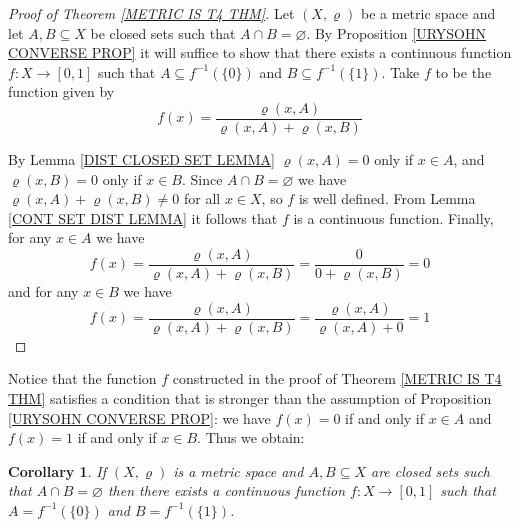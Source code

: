 \documentclass[11pt, letterpaper, oneside]{report}
\theoremstyle{pplain}
\newtheorem{corollary}[theorem]{Corollary}
\newtheorem{ITERMVALUE THM}[theorem]{Intermediate Value Theorem}
\newtheorem{HEINEBOREL THM}[theorem]{Heine-Borel Theorem}
\newtheorem{UMETR THM}[theorem]{Urysohn Metrization Theorem}
\newtheorem{UMETR2 THM}[theorem]{Urysohn Metrization Theorem (v.2)}
\theoremstyle{ddefinition}
\theoremstyle{nnn}
\newtheorem{TDA NN}[theorem]{Topological Data Analysis. }
\theoremstyle{eexercise}
\begin{document}
 \begin{proof}[Proof of Theorem \ref{METRIC IS T4 THM}]
 Let $(X, \varrho)$ be a metric space and let $A, B\subseteq X$ be closed sets such that 
 $A\cap B = \varnothing$. By Proposition \ref{URYSOHN CONVERSE PROP} it will 
 suffice to show that there exists a continuous function 
 $f\colon X \to [0, 1]$
 such that $A\subseteq f^{-1}(\{0\})$ and  $B\subseteq f^{-1}(\{1\})$.
Take $f$ to be the function given by
 $$f(x) = \frac{\varrho(x, A)}{\varrho(x, A)+\varrho(x, B)}$$
 
By Lemma \ref{DIST CLOSED SET LEMMA} $\varrho(x, A) = 0$ only if
 $x\in A$, and $\varrho(x, B) = 0$ only if $x\in B$. Since $A\cap B = \varnothing$ we 
 have $\varrho(x, A) + \varrho(x, B) \neq 0$ for all $x\in X$, so $f$ is well defined. 
From Lemma \ref{CONT SET DIST LEMMA} it follows that $f$ is a continuous 
function. Finally, for any $x\in A$ we have 
$$f(x) = \frac{\varrho(x, A)}{\varrho(x, A)+\varrho(x, B)} = \frac{0}{0+\varrho(x, B)}=0$$
and for any $x\in B$ we have 
$$f(x) = \frac{\varrho(x, A)}{\varrho(x, A)+\varrho(x, B)} = \frac{\varrho(x, A)}{\varrho(x, A)+ 0} =1$$
\end{proof}


Notice that the function $f$ constructed in the proof of Theorem \ref{METRIC IS T4 THM} satisfies 
a condition that is stronger than the assumption of Proposition \ref{URYSOHN CONVERSE PROP}:
we have $f(x) = 0$ if and only if $x\in A$ and $f(x)=1$ if and only if $x\in B$. Thus we obtain: 

\begin{corollary}
\label{METRIC PERFECTLY NORMAL COR}
If $(X, \varrho)$ is a metric space and $A, B\subseteq X$ are closed sets such that $A\cap B = \varnothing$
then there exists a continuous function $f\colon X \to [0, 1]$ such that $A = f^{-1}(\{0\})$ and $B= f^{-1}(\{1\})$.
\end{corollary}
\end{document}

